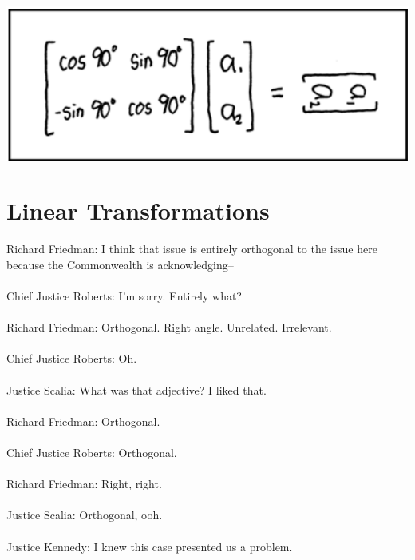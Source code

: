 \documentclass[oneside]{book}
\begin{document}
    

\begin{savequote}
    \includegraphics[scale=0.45]{Graphics/rotationmatrix.png}
\end{savequote}
\chapter{Linear Transformations} \label{chapter:lintrans}

    

\begin{savequote}
    Richard Friedman: I think that issue is entirely orthogonal to the issue here because the Commonwealth is acknowledging--
    \\
    \\
    Chief Justice Roberts: I'm sorry. Entirely what?
    \\
    \\
    Richard Friedman: Orthogonal. Right angle. Unrelated. Irrelevant.
    \\
    \\
    Chief Justice Roberts: Oh.
    \\
    \\
    Justice Scalia: What was that adjective? I liked that.
    \\
    \\
    Richard Friedman: Orthogonal.
    \\
    \\
    Chief Justice Roberts: Orthogonal.
    \\
    \\
    Richard Friedman: Right, right.
    \\
    \\
    Justice Scalia: Orthogonal, ooh.
    \\
    \\
    Justice Kennedy: I knew this case presented us a problem.
\end{savequote}
\end{document}
